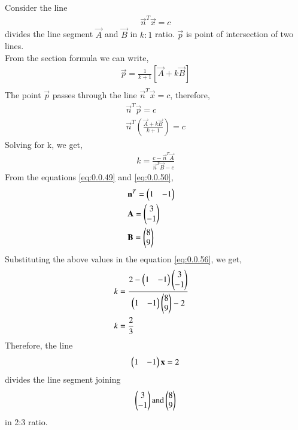 \documentclass[journal,12pt,twocolumn]{IEEEtran}
\renewcommand\thesection{\arabic{section}}
\begin{document}
\begin{enumerate}[label=\thesection.\arabic*.,ref=\thesection.\theenumi]
\solution Consider the line \begin{align} \vec{n}^T\vec{x}=c \end{align} divides the line segment $\vec{A}$ and $\vec{B} $ in $k:1$ ratio.
$\vec{p} $ is point of intersection of two lines.\\ 
From the section formula we can write,
\begin{align}
&\vec{p} = \displaystyle\frac{1}{k+1}\left[\vec{A}+ k\vec{B}\right]&\\
 \end{align}
The point $\vec{p}$ passes through the line $\vec{n}^T\vec{x}=c$, therefore,
\begin{align}
&\vec{n}^T\vec{p}=c&\\
&\vec{n}^T\left(\displaystyle\frac{\vec{A}+k\vec{B}}{k+1} \right)=c&
\end{align}
Solving for k, we get,
\begin{align}
&k=\displaystyle\frac{c-\vec{n}^T\vec{A}}{\vec{n}^T\vec{B}-c} \label{eq:0.0.56} &
\end{align}
From the equations \eqref{eq:0.0.49} and \eqref{eq:0.0.50},
\begin{align}
& \mathbf{n}^T = \begin{pmatrix}1&-1\end{pmatrix}&\\
& \mathbf{A} = \begin{pmatrix}3 \\-1\end{pmatrix}&\\
& \mathbf{B} = \begin{pmatrix}8\\9\end{pmatrix}
\end{align}
Substituting the above values in the equation \eqref{eq:0.0.56}, we get,
\begin{align}
& k = \displaystyle\frac{2-\begin{pmatrix}1&-1\end{pmatrix}\begin{pmatrix}3\\-1\end{pmatrix}}{\begin{pmatrix}1&-1\end{pmatrix}\begin{pmatrix}8\\9\end{pmatrix} - 2}&\\
&k = \displaystyle\frac{2}{3}
\end{align}
Therefore, the line \begin{align} \begin{pmatrix}1&-1\end{pmatrix}\mathbf{x}=2 \end{align} divides the line segment joining \begin{align}\begin{pmatrix}3 \\-1\end{pmatrix} \text{and} \begin{pmatrix}8\\9\end{pmatrix} \end{align} in 2:3 ratio.
\begin{figure}[H]
	\centering

\end{figure}
\end{enumerate}
\end{document}
